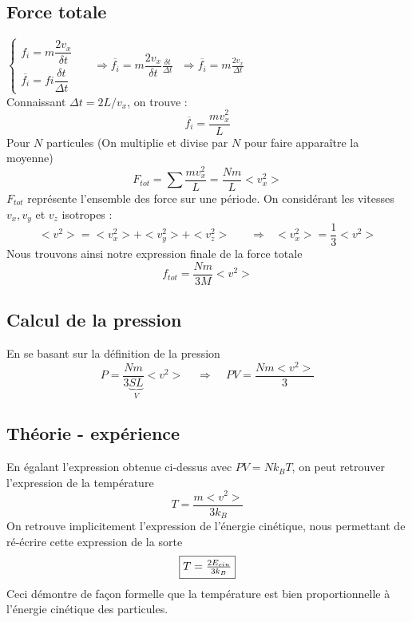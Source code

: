 \documentclass	[11pt, a4paper, openany]{book}
\begin{document}
\subsection{Force totale}
$\left\{\begin{array}{l}
f_i = m\dfrac{2v_x}{\delta t}\\
\overline{f_i} = fi\dfrac{\delta t}{\Delta t}
\end{array}\right.$\ \ \ $\Rightarrow \overline{f_i} = m\dfrac{2v_x}{\delta t}\frac{\delta t}{\Delta t}\ \ \ \Rightarrow \overline{f_i} = m\frac{2v_x}{\Delta t}$\\
Connaissant $\Delta t = 2L/v_x$, on trouve : 
\begin{equation}
	\overline{f_i} = \frac{mv_x^2}{L}
\end{equation}
Pour $N$ particules (On multiplie et divise par $N$ pour faire apparaître la moyenne)
\begin{equation}
	F_{tot} = \sum \frac{mv_x^2}{L} = \frac{Nm}{L}<v_x^2>
\end{equation}
$F_{tot}$ représente l'ensemble des force sur une période. On considérant les vitesses $v_x, v_y$ et $v_z$ isotropes :
\begin{equation}
	<v^2> = <v_x^2> + <v_y^2> + <v_z^2>\ \ \ \ \ \ \ \ \Rightarrow \ \ \ <v_x^2> = \frac{1}{3}<v^2>
\end{equation}
Nous trouvons ainsi notre expression finale de la force totale 
\begin{equation}
	f_{tot} = \frac{Nm}{3M}<v^2>
\end{equation}
\subsection{Calcul de la pression}
En se basant sur la définition de la pression
\begin{equation}
	P = \frac{Nm}{3\underbrace{SL}_V}<v^2>\ \ \ \ \ \Rightarrow \ \ \ \ \ PV = \frac{Nm<v^2>}{3}
\end{equation}
\subsection{Théorie - expérience}
En égalant l'expression obtenue ci-dessus avec $PV = Nk_BT$, on peut retrouver l'expression de la température
\begin{equation}
	T = \frac{m<v^2>}{3k_B}
\end{equation}
On retrouve implicitement l'expression de l'énergie cinétique, nous permettant de ré-écrire cette expression de la sorte
\begin{equation}
	\fbox{$ T = \frac{2E_{cin}}{3k_B}$}
\end{equation}
Ceci démontre de façon formelle que la température est bien proportionnelle à l'énergie cinétique des particules.
\end{document}
